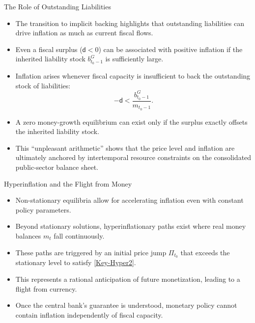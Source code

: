 \documentclass[11pt,aspectratio=169]{beamer}
\begin{document}
\begin{frame}{The Role of Outstanding Liabilities}
\small
\begin{itemize}
    \item The transition to implicit backing highlights that outstanding liabilities can drive inflation as much as current fiscal flows.
    \item Even a fiscal surplus (\(\mathsf{d}<0\)) can be associated with positive inflation if the inherited liability stock \(b_{t_{0}-1}^{G}\) is sufficiently large.
    \item Inflation arises whenever fiscal capacity is insufficient to back the outstanding stock of liabilities:
    \[
        -\mathsf{d} < \frac{b_{t_{0}-1}^{G}}{m_{t_{0}-1}}.
    \]
    \item A zero money-growth equilibrium can exist only if the surplus exactly offsets the inherited liability stock.
    \item This \enquote{unpleasant arithmetic} shows that the price level and inflation are ultimately anchored by intertemporal resource constraints on the consolidated public-sector balance sheet.
\end{itemize}
\end{frame}


\begin{frame}{Hyperinflation and the Flight from Money}
\small


\begin{itemize}
\item Non-stationary equilibria allow for accelerating inflation even with constant policy parameters.
    \item Beyond stationary solutions, hyperinflationary paths exist where real money balances $m_t$ fall continuously.
    \item These paths are triggered by an initial price jump $\Pi_{t_0}$ that exceeds the stationary level to satisfy \eqref{Key-Hyper2}.
    \item This represents a rational anticipation of future monetization, leading to a flight from currency.
    \item Once the central bank’s guarantee is understood, monetary policy cannot contain inflation independently of fiscal capacity.
\end{itemize}
\end{frame}
\end{document}
